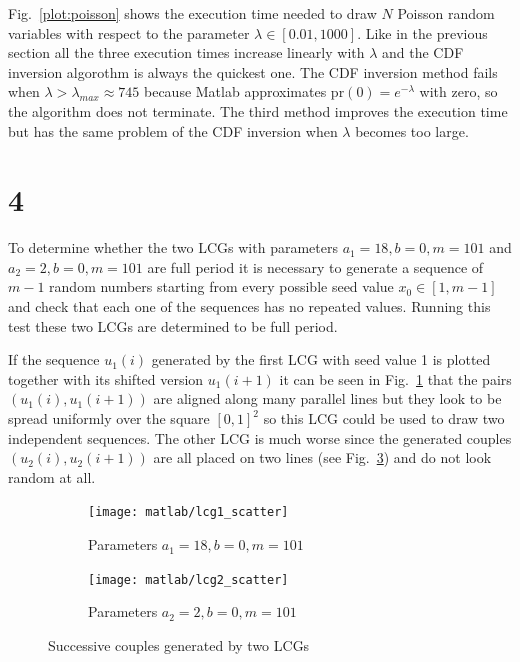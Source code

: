 \documentclass[a4paper,oneside]{article}
\begin{document}
Fig.~\ref{plot:poisson} shows the execution time needed to draw $N$
Poisson random variables with respect to the parameter $\lambda \in
[0.01, 1000]$. Like in the previous section all the three execution
times increase linearly with $\lambda$ and the CDF inversion algorothm
is always the quickest one. The CDF inversion method fails when
$\lambda > \lambda_{max} \approx 745$ because Matlab approximates $\mathrm{pr}(0) =
e^{-\lambda}$ with zero, so the algorithm does not terminate. The
third method improves the execution time but has the same problem of
the CDF inversion when $\lambda$ becomes too large.
\section*{4}
To determine whether the two LCGs with parameters $a_1 = 18, b=0,
m=101$ and $a_2 = 2, b=0, m=101$ are full period it is necessary to
generate a sequence of $m-1$ random numbers starting from every
possible seed value $x_0 \in [1, m-1]$ and check that each one of the
sequences has no repeated values. Running this test these two LCGs are
determined to be full period.

If the sequence $u_1(i)$ generated by the first LCG with seed value 1
is plotted together with its shifted version $u_1(i+1)$ it can be seen
in Fig.~\ref{plot:lcg1_scatter} that the pairs $(u_1(i), u_1(i+1))$
are aligned along many parallel lines but they look to be spread
uniformly over the square $[0,1]^2$ so this LCG could be used to draw
two independent sequences. The other LCG is much worse since the
generated couples $(u_2(i), u_2(i+1))$ are all placed on two lines
(see Fig.~\ref{plot:lcg2_scatter}) and do not look random at all.
\begin{figure}[htbp]
  \centering
  \begin{subfigure}{0.5\textwidth}
    \centering
    \texttt{[image: matlab/lcg1\_scatter]}
    \caption{Parameters $a_1 = 18, b=0, m=101$}
    \label{plot:lcg1_scatter}
  \end{subfigure}%
  \begin{subfigure}{0.5\textwidth}
    \centering
    \texttt{[image: matlab/lcg2\_scatter]}
    \caption{Parameters $a_2 = 2, b=0, m=101$}
    \label{plot:lcg2_scatter}
  \end{subfigure}
  \caption{Successive couples generated by two LCGs}
\end{figure}
\end{document}
